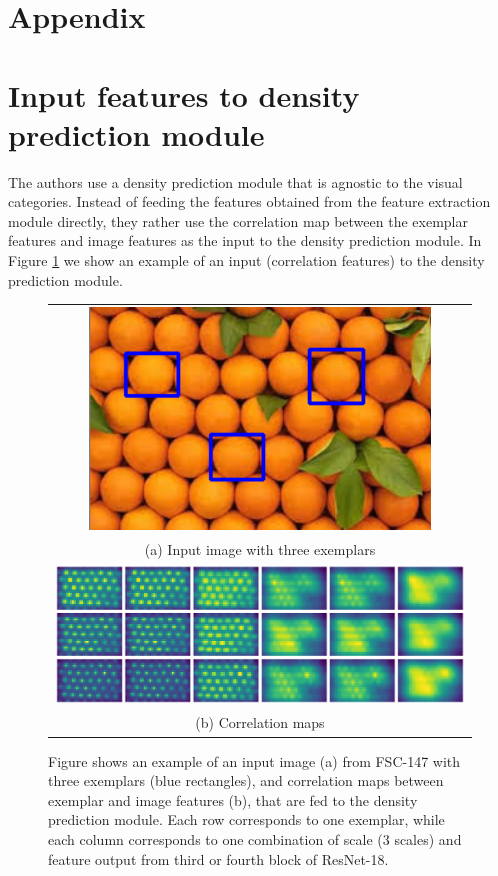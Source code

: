 \newpage
\section*{Appendix}

\section{Input features to density prediction module}
\label{app:input_features}

The authors use a density prediction module that is agnostic to the visual categories. Instead of feeding the features obtained from the feature extraction module directly, they rather use the correlation map between the exemplar features and image features as the input to the density prediction module. In Figure \ref{fig:orange_copmuted_features} we show an example of an input (correlation features) to the density prediction module.

\begin{figure}[htb]
	\centering
	\begin{tabular}{c}
		\includegraphics[width=0.15\linewidth]{fig/orange_bounding_boxes.png} \\ 
		(a) Input image with three exemplars \\
		\includegraphics[width=0.8\linewidth]{fig/orange_features.png} \\
		(b) Correlation maps
	\end{tabular}
	\caption{Figure shows an example of an input image (a) from FSC-147 with three exemplars (blue rectangles), and correlation maps between exemplar and image features (b), that are fed to the density prediction module. Each row corresponds to one exemplar, while each column corresponds to one combination of scale (3 scales) and feature output from third or fourth block of ResNet-18.}
	\label{fig:orange_copmuted_features}
\end{figure}

